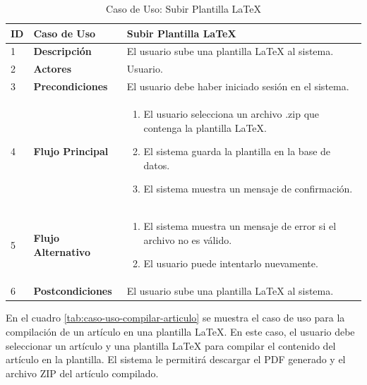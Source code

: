 \begin{table}[H]
    \centering
        \begin{tabular}{|p{0.5cm}|p{3.5cm}|p{10cm}|}
        \hline
        \textbf{ID} & \textbf{Caso de Uso} & \textbf{Subir Plantilla LaTeX} \\
        \hline
        1 & \textbf{Descripción} & El usuario sube una plantilla LaTeX al sistema. \\
        \hline
        2 & \textbf{Actores} & Usuario. \\
        \hline
        3 & \textbf{Precondiciones} & El usuario debe haber iniciado sesión en el sistema. \\
        \hline
        4 & \textbf{Flujo Principal} & 
        \begin{enumerate}
            \item El usuario selecciona un archivo .zip que contenga la plantilla LaTeX.
            \item El sistema guarda la plantilla en la base de datos.
            \item El sistema muestra un mensaje de confirmación.
        \end{enumerate} \\
        \hline
        5 & \textbf{Flujo Alternativo} & 
        \begin{enumerate}
            \item El sistema muestra un mensaje de error si el archivo no es válido.
            \item El usuario puede intentarlo nuevamente.
        \end{enumerate} \\
        \hline
        6 & \textbf{Postcondiciones} & El usuario sube una plantilla LaTeX al sistema. \\
        \hline
    \end{tabular}
    \caption{Caso de Uso: Subir Plantilla LaTeX}
\label{tab:caso-uso-subir-plantilla}
\end{table}

En el cuadro \ref{tab:caso-uso-compilar-articulo} se muestra el caso de uso para la compilación de un artículo en una plantilla LaTeX. En este caso, el usuario debe seleccionar un artículo y una plantilla LaTeX para compilar el contenido del artículo en la plantilla. El sistema le permitirá descargar el PDF generado y el archivo ZIP del artículo compilado. 

